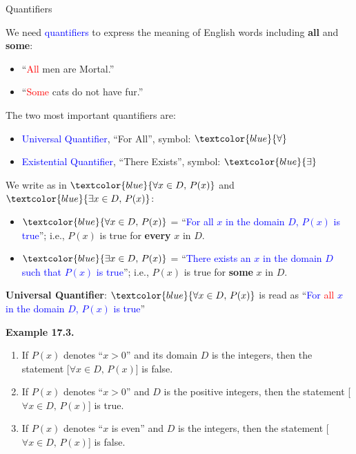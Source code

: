 \documentclass[aspectratio=169]{beamer}
\providecommand{\Blue}[1]{\textcolor{blue}{#1}}
\providecommand{\Red}[1]{\textcolor{red}{#1}}
\begin{document}
\begin{frame}[plain]{Quantifiers}
  
  We need \Blue{quantifiers} to express the meaning of English
        words including {\bf all} and {\bf some}: 
     \begin{itemize}
       \item ``\Red{All} men are Mortal.''
       \item  ``\Red{Some} cats do not have fur.''
     \end{itemize}
     \pause 
     
    The two most important quantifiers are: 
       \begin{itemize}
         \item \Blue{Universal Quantifier}, ``For All'', symbol: $\Blue{\forall}$
         \item \Blue{Existential Quantifier}, ``There Exists'', symbol: $\Blue{\exists}$
       \end{itemize}
      \pause 
      
      
     We write as in $\Blue{\forall x\in D,\, P(x)}$ and $\Blue{\exists x\in D,\, P(x)}$: \pause 
       \begin{itemize}[<+->]
         \item $\Blue{\forall x\in D,\, P(x)}$ = ``\Blue{For all $x$ in the domain $D$, $P(x)$ is true}''; i.e., 
              $P(x)$ is true for {\bf every} $x$ in 
             $D$.
         \item $\Blue{\exists x\in D,\, P(x)}$ = ``\Blue{There exists an $x$ in the domain $D$ 
            such that $P(x)$ is true}''; i.e.,  $P(x)$ is true for {\bf some} $x$ in $D$.
       \end{itemize}
\end{frame}

\begin{frame}[plain]{ }
  
  
  {\bf Universal Quantifier}: 
      $\Blue{\forall x\in D,\, P(x)}$ is read as ``\Blue{For \Red{all} $x$ in the domain $D$, $P(x)$ is true}'' 
      \medskip
      
   {\bf Example 17.3.}
     \begin{enumerate}[<+->]
      \item If $P(x)$ denotes ``$x>0$'' and its domain $D$ is the integers, then the statement
         [$\forall x\in D,\, P(x)$] is false.
      \item If $P(x)$ denotes ``$x>0$'' and $D$ is the positive integers, then the statement
         [$\forall x\in D,\, P(x)$] is true.
      \item If $P(x)$ denotes ``$x$ is even'' and $D$ is the integers, then the statement
         [$\forall x\in D,\, P(x)$] is false.
     \end{enumerate}
  
\end{frame}
\end{document}
